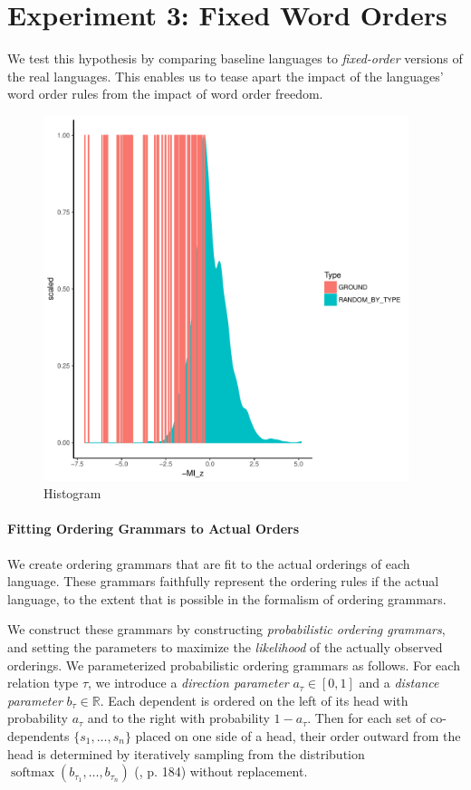 \documentclass[11pt,letterpaper]{article}
\begin{document}
\section{Experiment 3: Fixed Word Orders}

We test this hypothesis by comparing baseline languages to \emph{fixed-order} versions of the real languages.
This enables us to tease apart the impact of the languages' word order rules from the impact of word order freedom.


\begin{figure}
\includegraphics[width=0.95\textwidth]{neural/figures/full-GROUND-listener-surprisal-memory-HIST_z_byMem_onlyWordForms_boundedVocab.pdf}
	\caption{Histogram}\label{fig:hist-real}
\end{figure}



\paragraph{Fitting Ordering Grammars to Actual Orders}
We create ordering grammars that are fit to the actual orderings of each language.
These grammars faithfully represent the ordering rules if the actual language, to the extent that is possible in the formalism of ordering grammars.

We construct these grammars by constructing \emph{probabilistic ordering grammars}, and setting the parameters to maximize the \emph{likelihood} of the actually observed orderings.
We parameterized probabilistic ordering grammars as follows.
For each relation type $\tau$, we introduce a \emph{direction parameter} $a_\tau \in [0,1]$ and a \emph{distance parameter} $b_\tau \in \mathbb{R}$.
Each dependent is ordered on the left of its head with probability $a_\tau$ and to the right with probability $1-a_\tau$. 
Then for each set of co-dependents $\{s_1, \dots , s_n\}$ placed on one side of a head, their order outward from the head is determined by iteratively sampling from the distribution $\operatorname{softmax}(b_{\tau_1}, \dots, b_{\tau_n})$ (\cite{goodfellow2016deep}, p. 184) without replacement. 
\end{document}
